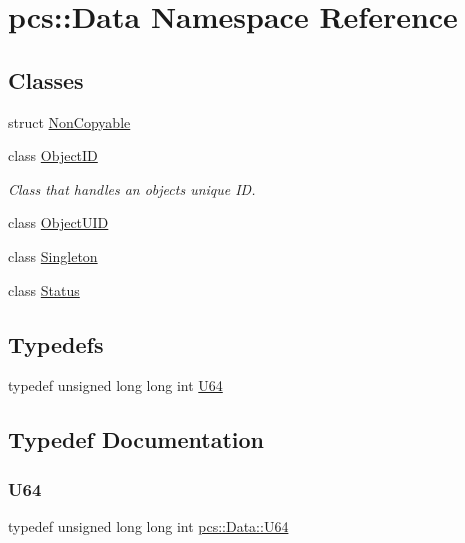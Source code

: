 \hypertarget{namespacepcs_1_1Data}{}\section{pcs\+:\+:Data Namespace Reference}
\label{namespacepcs_1_1Data}
\subsection*{Classes}
\begin{DoxyCompactItemize}
\item 
struct \hyperlink{structpcs_1_1Data_1_1NonCopyable}{Non\+Copyable}
\item 
class \hyperlink{classpcs_1_1Data_1_1ObjectID}{Object\+ID}
\begin{DoxyCompactList}\small\item\em Class that handles an object\textquotesingle{}s unique ID. \end{DoxyCompactList}\item 
class \hyperlink{classpcs_1_1Data_1_1ObjectUID}{Object\+U\+ID}
\item 
class \hyperlink{classpcs_1_1Data_1_1Singleton}{Singleton}
\item 
class \hyperlink{classpcs_1_1Data_1_1Status}{Status}
\end{DoxyCompactItemize}
\subsection*{Typedefs}
\begin{DoxyCompactItemize}
\item 
typedef unsigned long long int \hyperlink{namespacepcs_1_1Data_a9aad6b21cf2fcd3515ecc3bbd069eb34}{U64}
\end{DoxyCompactItemize}


\subsection{Typedef Documentation}
\mbox{\label{namespacepcs_1_1Data_a9aad6b21cf2fcd3515ecc3bbd069eb34}} 
\subsubsection{\texorpdfstring{U64}{U64}}
{\footnotesize\ttfamily typedef unsigned long long int \hyperlink{namespacepcs_1_1Data_a9aad6b21cf2fcd3515ecc3bbd069eb34}{pcs\+::\+Data\+::\+U64}}

